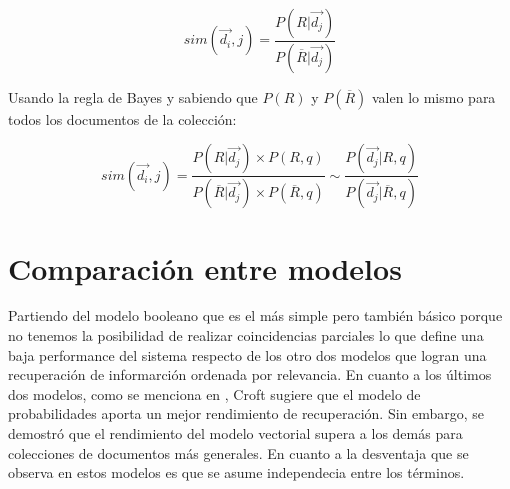 			\begin{equation}
				sim(\overrightarrow{d_{i}},j) = \frac{P(R | \overrightarrow{d_{j}})}{P(\overline{R} | \overrightarrow{d_{j}})}
			\end{equation}	
				
Usando la regla de Bayes y sabiendo que $P(R)$ y $P(\overline{R})$ valen lo mismo para todos los documentos de la colección:

			\begin{equation}
				sim(\overrightarrow{d_{i}},j) = \frac{P(R | \overrightarrow{d_{j}}) \times P(R,q)}{P(\overline{R} | \overrightarrow{d_{j}}) \times P(\overline{R},q)} \sim  \frac{P(\overrightarrow{d_{j}} | R, q)}{P( \overrightarrow{d_{j}} | \overline{R}, q)}
			\end{equation}	
				


\section{Comparación entre modelos}

Partiendo del modelo booleano que es el más simple pero también básico porque no tenemos la posibilidad de realizar coincidencias parciales lo que define una baja performance del sistema respecto de los otro dos modelos que logran una recuperación de informarción ordenada por relevancia.
En cuanto a los últimos dos modelos, como se menciona en \cite{baeza1999}, Croft sugiere que el modelo de probabilidades aporta un mejor rendimiento de recuperación. Sin embargo, se demostró que el rendimiento del modelo vectorial supera a los demás para colecciones de documentos más generales.
En cuanto a la desventaja que se observa en estos modelos es que se asume independecia entre los términos.
